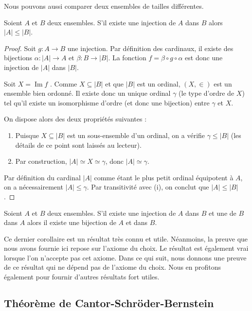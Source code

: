 Nous pouvons aussi comparer deux ensembles de tailles différentes.

\begin{proposition}
    Soient $A$ et $B$ deux ensembles. S'il existe une injection de $A$ dans $B$ alors $|A|\le |B|$.
\end{proposition}

\begin{proof}
    
Soit $g : A \to B$ une injection. Par définition des cardinaux, il existe des bijections $\alpha : |A| \to A$ et $\beta : B \to |B|$. La fonction $f = \beta \circ g \circ \alpha$ est donc une injection de $|A|$ dans $|B|$.

Soit $X = \operatorname{Im}f$ . Comme $X \subseteq |B|$ et que $|B|$ est un ordinal, $(X, \in)$ est un ensemble bien ordonné. Il existe donc un unique ordinal $\gamma$ (le type d'ordre de $X$) tel qu'il existe un isomorphisme d'ordre (et donc une bijection) entre $\gamma$ et $X$.

On dispose alors des deux propriétés suivantes :
\begin{enumerate}
    \item Puisque $X \subseteq |B|$ est un sous-ensemble d'un ordinal, on a vérifie $\gamma \le |B|$ (les détails de ce point sont laissés au lecteur).
    \item Par construction, $|A| \simeq X \simeq \gamma$, donc $|A| \simeq \gamma$.
\end{enumerate}

Par définition du cardinal $|A|$ comme étant le plus petit ordinal équipotent à $A$, on a nécessairement $|A| \le \gamma$. Par transitivité avec (i), on conclut que $|A| \le |B|$.
\end{proof}

\begin{corollaire}
    Soient $A$ et $B$ deux ensembles.  S'il existe une injection de $A$ dans $B$ et une de $B$ dans $A$ alors il existe une bijection de $A$ et dans $B$.
\end{corollaire}

Ce dernier corollaire est un résultat très connu et utile. Néanmoins, la preuve que nous avons fournie ici repose sur l'axiome du choix. Le résultat est également vrai lorsque l'on n'accepte pas cet axiome. Dans ce qui suit, nous donnons une preuve de ce résultat qui ne dépend pas de l'axiome du choix. Nous en profitons également pour fournir d'autres résultats fort utiles.

\subsection{Théorème de Cantor-Schröder-Bernstein}

